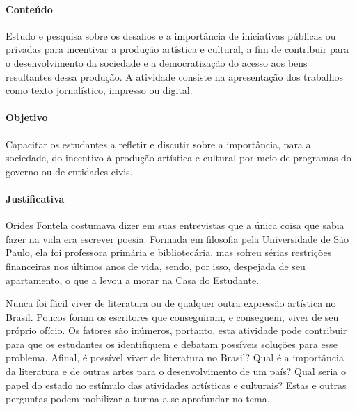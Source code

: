\documentclass[12pt]{extarticle}
\begin{document}
\paragraph{Conteúdo} Estudo e pesquisa sobre os desafios e a importância
de iniciativas públicas ou privadas para incentivar a produção artística
e cultural, a fim de contribuir para o desenvolvimento da sociedade e a
democratização do acesso aos bens resultantes dessa produção. A
atividade consiste na apresentação dos trabalhos como texto
jornalístico, impresso ou digital.

\paragraph{Objetivo} Capacitar os estudantes a refletir e discutir sobre a
importância, para a sociedade, do incentivo à produção artística e
cultural por meio de programas do governo ou de entidades civis.

\paragraph{Justificativa} Orides Fontela costumava dizer em suas
entrevistas que a única coisa que sabia fazer na vida era escrever
poesia. Formada em filosofia pela Universidade de São Paulo, ela foi
professora primária e bibliotecária, mas sofreu sérias restrições
financeiras nos últimos anos de vida, sendo, por isso, despejada de seu
apartamento, o que a levou a morar na Casa do Estudante.

Nunca foi fácil viver de literatura ou de qualquer outra expressão
artística no Brasil. Poucos foram os escritores que conseguiram, e
conseguem, viver de seu próprio ofício. Os fatores são inúmeros,
portanto, esta atividade pode contribuir para que os estudantes os
identifiquem e debatam possíveis soluções para esse problema. Afinal, é
possível viver de literatura no Brasil? Qual é a importância da
literatura e de outras artes para o desenvolvimento de um país? Qual
seria o papel do estado no estímulo das atividades artísticas e
culturais? Estas e outras perguntas podem mobilizar a turma a se
aprofundar no tema.
\end{document}
